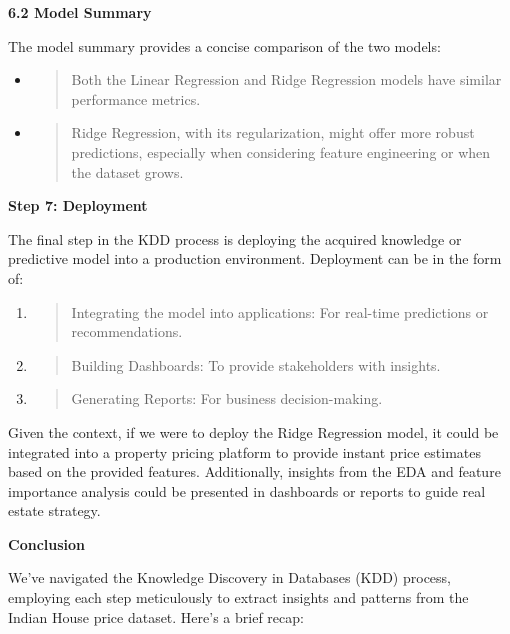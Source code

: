 \documentclass[]{article}
\newcommand{\textcenter}[1]{\begin{center} \vspace{10px}\textbf{\large #1} \end{center}}
\begin{document}
\textbf{6.2 Model Summary}

The model summary provides a concise comparison of the two models:

\begin{itemize}
\item
  \begin{quote}
  Both the Linear Regression and Ridge Regression models have similar
  performance metrics.
  \end{quote}
\item
  \begin{quote}
  Ridge Regression, with its regularization, might offer more robust
  predictions, especially when considering feature engineering or when
  the dataset grows.
  \end{quote}
\end{itemize}

\textcenter{Step 7: Deployment}

The final step in the KDD process is deploying the acquired knowledge or
predictive model into a production environment. Deployment can be in the
form of:

\begin{enumerate}
\def\labelenumi{\arabic{enumi}.}
\item
  \begin{quote}
  Integrating the model into applications: For real-time predictions or
  recommendations.
  \end{quote}
\item
  \begin{quote}
  Building Dashboards: To provide stakeholders with insights.
  \end{quote}
\item
  \begin{quote}
  Generating Reports: For business decision-making.
  \end{quote}
\end{enumerate}

Given the context, if we were to deploy the Ridge Regression model, it
could be integrated into a property pricing platform to provide instant
price estimates based on the provided features. Additionally, insights
from the EDA and feature importance analysis could be presented in
dashboards or reports to guide real estate strategy.

\textbf{Conclusion}

We've navigated the Knowledge Discovery in Databases (KDD) process,
employing each step meticulously to extract insights and patterns from
the Indian House price dataset. Here's a brief recap:
\end{document}
